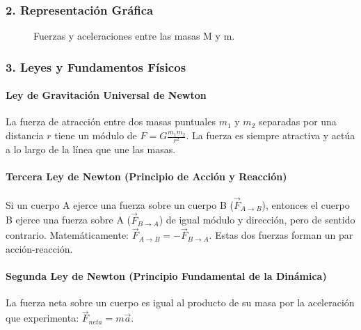 \subsubsection*{2. Representación Gráfica}
\begin{figure}[H]
    \centering
    \caption{Fuerzas y aceleraciones entre las masas M y m.}
\end{figure}

\subsubsection*{3. Leyes y Fundamentos Físicos}
\paragraph*{Ley de Gravitación Universal de Newton}
La fuerza de atracción entre dos masas puntuales $m_1$ y $m_2$ separadas por una distancia $r$ tiene un módulo de $F = G \frac{m_1 m_2}{r^2}$. La fuerza es siempre atractiva y actúa a lo largo de la línea que une las masas.

\paragraph*{Tercera Ley de Newton (Principio de Acción y Reacción)}
Si un cuerpo A ejerce una fuerza sobre un cuerpo B ($\vec{F}_{A \to B}$), entonces el cuerpo B ejerce una fuerza sobre A ($\vec{F}_{B \to A}$) de igual módulo y dirección, pero de sentido contrario. Matemáticamente: $\vec{F}_{A \to B} = -\vec{F}_{B \to A}$. Estas dos fuerzas forman un par acción-reacción.

\paragraph*{Segunda Ley de Newton (Principio Fundamental de la Dinámica)}
La fuerza neta sobre un cuerpo es igual al producto de su masa por la aceleración que experimenta: $\vec{F}_{neta} = m\vec{a}$.


